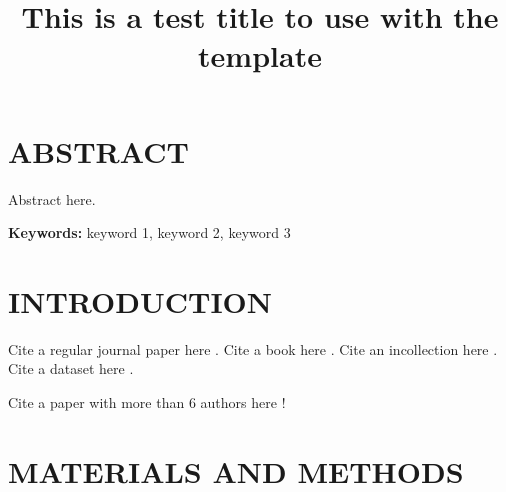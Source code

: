 \documentclass[nummaxdoi]{emerald}
\begin{document}
\title{This is a test title to use with the template}





%
%
%
%






\clearpage
\section*{ABSTRACT}
\par Abstract here.

\par \noindent \textbf{Keywords:} keyword 1, keyword 2, keyword 3




\clearpage
\section{INTRODUCTION}
\par Cite a regular journal paper here \citep{Wang-2020-Stomatal-Optimality}. Cite a book here \citep{tyree2002xylem}. Cite an incollection here \citep{Rouse-1973-NDVI}. Cite a dataset here \citep{CliMA-Land-Code, Wang-2020-Stomatal-Optimality}.

\par Cite a paper with more than 6 authors here \citep{Clark-2011-JULES}!




\section{MATERIALS AND METHODS}
\end{document}
